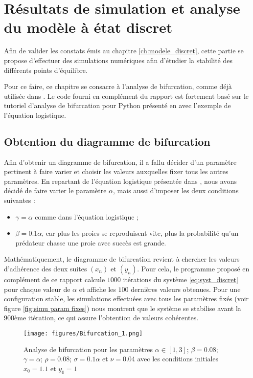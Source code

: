 \chapter{Résultats de simulation et analyse du modèle à état discret}
\label{ch:simu}

Afin de valider les constats émis au chapitre \ref{ch:modele_discret}, cette partie se propose d'effectuer des simulations numériques afin d'étudier la stabilité des différents points d'équilibre.

Pour ce faire, ce chapitre se consacre à l'analyse de bifurcation, comme déjà utilisée dans \cite{ChaosControl}. Le code fourni en complément du rapport est fortement basé sur le tutoriel d'analyse de bifurcation pour Python présenté en \cite{bifurc} avec l'exemple de l'équation logistique.

\section{Obtention du diagramme de bifurcation}

Afin d'obtenir un diagramme de bifurcation, il a fallu décider d'un paramètre pertinent à faire varier et choisir les valeurs auxquelles fixer tous les autres paramètres. En repartant de l'équation logistique présentée dans \cite{bifurc}, nous avons décidé de faire varier le paramètre $\alpha$, mais aussi d'imposer les deux conditions suivantes :
\begin{itemize}
	\item $\gamma = \alpha$ comme dans l'équation logistique ;
	\item $\beta = 0.1 \alpha$, car plus les proies se reproduisent vite, plus la probabilité qu'un prédateur chasse une proie avec succès est grande.
\end{itemize}

Mathématiquement, le diagramme de bifurcation revient à chercher les valeurs d'adhérence des deux suites $(x_n)$ et $(y_n)$. Pour cela, le programme proposé en complément de ce rapport calcule $1000$ itérations du système \ref{eq:syst_discret} pour chaque valeur de $\alpha$ et affiche les $100$ dernières valeurs obtenues. Pour une configuration stable, les simulations effectuées avec tous les paramètres fixés (voir figure \ref{fig:simu param fixes}) nous montrent que le système se stabilise avant la $900$ème itération, ce qui assure l'obtention de valeurs cohérentes.


\begin{figure}
    \begin{center}
		\texttt{[image: figures/Bifurcation\_1.png]}
	\end{center}
	\caption{Analyse de bifurcation pour les paramètres $\alpha \in [1, 3]$; $\beta = 0.08$; $\gamma = \alpha$; $\rho = 0.08$; $\sigma = 0.1 \alpha$ et $\nu = 0.04$ avec les conditions initiales $x_0 = 1.1$ et $y_0 = 1$}
    \label{fig:bifurc}
\end{figure}

